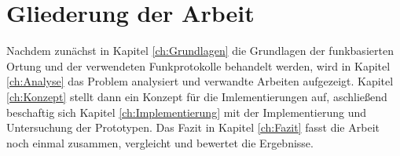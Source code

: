 \section{Gliederung der Arbeit}
\label{ch:Einleitung:sec:Gliederung}
Nachdem zunächst in Kapitel \ref{ch:Grundlagen} die Grundlagen der funkbasierten Ortung und der verwendeten Funkprotokolle behandelt werden, wird in Kapitel \ref{ch:Analyse} das Problem analysiert und verwandte Arbeiten aufgezeigt.
Kapitel \ref{ch:Konzept} stellt dann ein Konzept für die Imlementierungen auf, aschließend beschaftig sich Kapitel \ref{ch:Implementierung} mit der Implementierung und Untersuchung der Prototypen. 
Das Fazit in Kapitel \ref{ch:Fazit} fasst die Arbeit noch einmal zusammen, vergleicht und bewertet die Ergebnisse.
